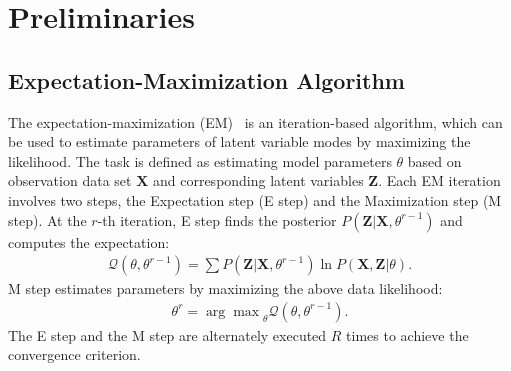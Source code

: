 \section{Preliminaries}

\subsection{Expectation-Maximization Algorithm}
The expectation-maximization (EM)~\cite{em} is an iteration-based algorithm, which can be used to estimate parameters of latent variable modes by maximizing the likelihood. The task is defined as estimating model parameters $\theta$ based on observation data set $\mathbf{X}$ %
and corresponding latent variables $\mathbf{Z}$. %
Each EM iteration involves two steps, the Expectation step (E step) and the Maximization step (M step). At the $r$-th iteration, E step finds the posterior $P(\mathbf{Z}|\mathbf{X}, \theta^{r-1})$ and computes the expectation:
\vspace{-0.2cm}
	\begin{equation}
	\begin{split}
	 \mathcal{Q}(\theta, \theta^{r-1})=\sum P(\mathbf{Z}|\mathbf{X}, \theta^{r-1})\ln P(\mathbf{X}, \mathbf{Z}|\theta).
	\end{split}
	\label{eq:EM_E}
	\end{equation}
M step estimates parameters by maximizing the above data likelihood:
\vspace{-0.2cm}
	\begin{equation}
	\begin{split}
	 \theta^{r} = {\arg\max}_{\theta}\mathcal{Q}(\theta, \theta^{r-1}).
	\end{split}
	\label{eq:EM_M}
	\end{equation}
The E step and the M step are alternately executed $R$ times to achieve the convergence criterion.

